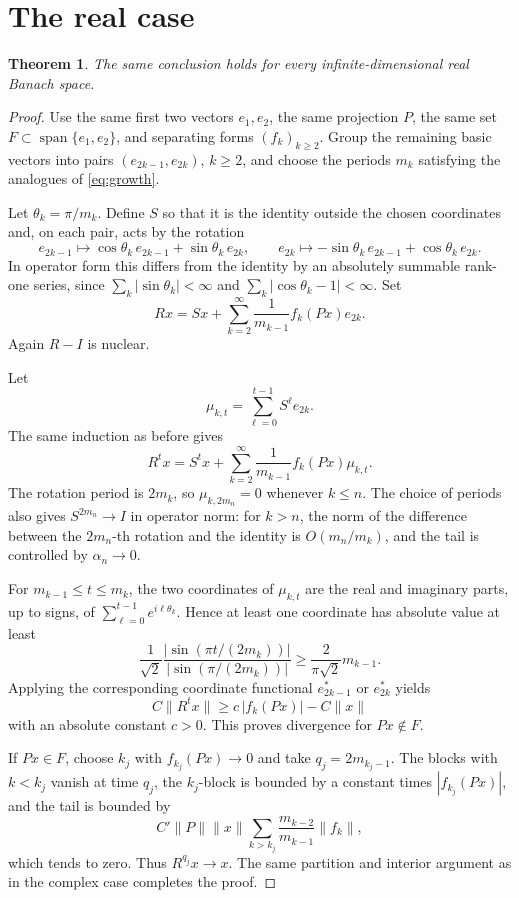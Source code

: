 \documentclass[11pt]{article}
\newtheorem{theorem}{Theorem}
\begin{document}
\section{The real case}

\begin{theorem}\label{thm:real}
The same conclusion holds for every infinite-dimensional real Banach space.
\end{theorem}

\begin{proof}
Use the same first two vectors \(e_1,e_2\), the same projection \(P\), the
same set \(F\subset \operatorname{span}\{e_1,e_2\}\), and separating forms
\((f_k)_{k\ge2}\).  Group the remaining basic vectors into pairs
\((e_{2k-1},e_{2k})\), \(k\ge2\), and choose the periods \(m_k\) satisfying
the analogues of \eqref{eq:growth}.

Let \(\theta_k=\pi/m_k\).  Define \(S\) so that it is the identity outside the
chosen coordinates and, on each pair, acts by the rotation
\[
  e_{2k-1}\mapsto \cos\theta_k\,e_{2k-1}+\sin\theta_k\,e_{2k},
  \qquad
  e_{2k}\mapsto -\sin\theta_k\,e_{2k-1}+\cos\theta_k\,e_{2k}.
\]
In operator form this differs from the identity by an absolutely summable
rank-one series, since \(\sum_k |\sin\theta_k|<\infty\) and
\(\sum_k |\cos\theta_k-1|<\infty\).  Set
\[
  Rx=Sx+\sum_{k=2}^\infty \frac{1}{m_{k-1}}f_k(Px)e_{2k}.
\]
Again \(R-I\) is nuclear.

Let
\[
  \mu_{k,t}=\sum_{\ell=0}^{t-1}S^\ell e_{2k}.
\]
The same induction as before gives
\[
  R^t x=S^t x+\sum_{k=2}^\infty \frac{1}{m_{k-1}}f_k(Px)\mu_{k,t}.
\]
The rotation period is \(2m_k\), so \(\mu_{k,2m_n}=0\) whenever \(k\le n\).
The choice of periods also gives \(S^{2m_n}\to I\) in operator norm: for
\(k>n\), the norm of the difference between the \(2m_n\)-th rotation and the
identity is \(O(m_n/m_k)\), and the tail is controlled by \(\alpha_n\to0\).

For \(m_{k-1}\le t\le m_k\), the two coordinates of \(\mu_{k,t}\) are the real
and imaginary parts, up to signs, of
\(\sum_{\ell=0}^{t-1}e^{i\ell\theta_k}\).  Hence at least one coordinate has
absolute value at least
\[
  \frac{1}{\sqrt2}
  \frac{|\sin(\pi t/(2m_k))|}{|\sin(\pi/(2m_k))|}
  \ge \frac{2}{\pi\sqrt2}m_{k-1}.
\]
Applying the corresponding coordinate functional \(e_{2k-1}^*\) or
\(e_{2k}^*\) yields
\[
  C\|R^t x\|\ge c\,|f_k(Px)|-C\|x\|
\]
with an absolute constant \(c>0\).  This proves divergence for \(Px\notin F\).

If \(Px\in F\), choose \(k_j\) with \(f_{k_j}(Px)\to0\) and take
\(q_j=2m_{k_j-1}\).  The blocks with \(k<k_j\) vanish at time \(q_j\), the
\(k_j\)-block is bounded by a constant times \(|f_{k_j}(Px)|\), and the tail
is bounded by
\[
  C'\|P\|\|x\|\sum_{k>k_j}\frac{m_{k-2}}{m_{k-1}}\|f_k\|,
\]
which tends to zero.  Thus \(R^{q_j}x\to x\).  The same partition and interior
argument as in the complex case completes the proof.
\end{proof}
\end{document}
